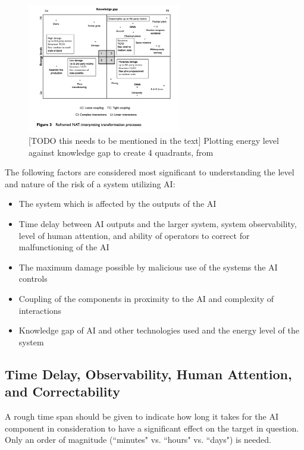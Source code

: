 \documentclass[11pt]{article}
\begin{document}
\begin{figure}[h]
    \centering
    \includegraphics[width=0.6\textwidth]{images/reframed-nat-2axis}
    \caption{[TODO this needs to be mentioned in the text] Plotting energy level against knowledge
    gap to create 4 quadrants, from \cite{shrivastava2009normal}}
    \label{fig:quad}
\end{figure}

The following factors are considered most significant to understanding the level and nature of
the risk of a system utilizing AI:

\begin{itemize}
    \item The system which is affected by the outputs of the AI
    \item Time delay between AI outputs and the larger system, system observability, level of human
        attention, and ability of operators to correct for malfunctioning of the AI
    \item The maximum damage possible by malicious use of the systems the AI controls
    \item Coupling of the components in proximity to the AI and complexity of interactions
    \item Knowledge gap of AI and other technologies used and the energy level of the system
\end{itemize}

\subsection{Time Delay, Observability, Human Attention, and Correctability}

A rough time span should be given to indicate how long it takes for the AI component in
consideration to have a significant effect on the target in question. Only an order of magnitude
(``minutes" vs. ``hours" vs. ``days") is needed.
\end{document}
